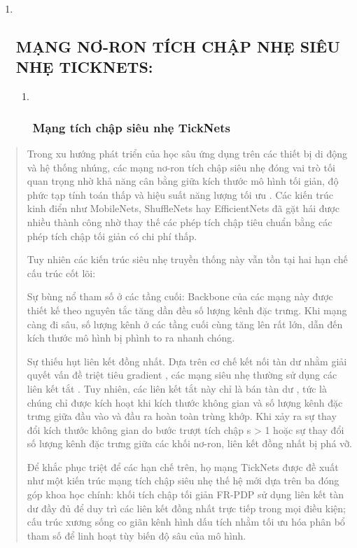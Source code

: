 \documentclass[
]{article}
\begin{document}
\begin{enumerate}
\def\labelenumi{\arabic{enumi}.}
\item ~
  \hypertarget{mux1ea1ng-nux1a1-ron-tuxedch-chux1eadp-nhux1eb9-siuxeau-nhux1eb9-ticknets}{%
  \subsection{MẠNG NƠ-RON TÍCH CHẬP NHẸ SIÊU NHẸ
  TICKNETS:}\label{mux1ea1ng-nux1a1-ron-tuxedch-chux1eadp-nhux1eb9-siuxeau-nhux1eb9-ticknets}}

  \begin{enumerate}
  \def\labelenumii{\arabic{enumii}.}
  \item ~
    \hypertarget{mux1ea1ng-tuxedch-chux1eadp-siuxeau-nhux1eb9-ticknets}{%
    \subsubsection{Mạng tích chập siêu nhẹ
    TickNets}\label{mux1ea1ng-tuxedch-chux1eadp-siuxeau-nhux1eb9-ticknets}}
  \end{enumerate}
\end{enumerate}

\begin{quote}
Trong xu hướng phát triển của học sâu ứng dụng trên các thiết bị di động
và hệ thống nhúng, các mạng nơ-ron tích chập siêu nhẹ đóng vai trò tối
quan trọng nhờ khả năng cân bằng giữa kích thước mô hình tối giản, độ
phức tạp tính toán thấp và hiệu suất năng lượng tối ưu . Các kiến trúc
kinh điển như MobileNets, ShuffleNets hay EfficientNets đã gặt hái được
nhiều thành công nhờ thay thế các phép tích chập tiêu chuẩn bằng các
phép tích chập tối giản có chi phí thấp.

Tuy nhiên các kiến trúc siêu nhẹ truyền thống này vẫn tồn tại hai hạn
chế cấu trúc cốt lõi:

Sự bùng nổ tham số ở các tầng cuối: Backbone của các mạng này được thiết
kế theo nguyên tắc tăng dần đều số lượng kênh đặc trưng. Khi mạng càng
đi sâu, số lượng kênh ở các tầng cuối cùng tăng lên rất lớn, dẫn đến
kích thước mô hình bị phình to ra nhanh chóng.

Sự thiếu hụt liên kết đồng nhất. Dựa trên cơ chế kết nối tàn dư nhằm
giải quyết vấn đề triệt tiêu gradient , các mạng siêu nhẹ thường sử dụng
các liên kết tắt . Tuy nhiên, các liên kết tắt này chỉ là bán tàn dư ,
tức là chúng chỉ được kích hoạt khi kích thước không gian và số lượng
kênh đặc trưng giữa đầu vào và đầu ra hoàn toàn trùng khớp. Khi xảy ra
sự thay đổi kích thước không gian do bước trượt tích chập s
\textgreater{} 1 hoặc sự thay đổi số lượng kênh đặc trưng giữa các khối
nơ-ron, liên kết đồng nhất bị phá vỡ.

Để khắc phục triệt để các hạn chế trên, họ mạng TickNets được đề xuất
như một kiến trúc mạng tích chập siêu nhẹ thế hệ mới dựa trên ba đóng
góp khoa học chính: khối tích chập tối giản FR-PDP sử dụng liên kết tàn
dư đầy đủ để duy trì các liên kết đồng nhất trực tiếp trong mọi điều
kiện; cấu trúc xương sống co giãn kênh hình dấu tích nhằm tối ưu hóa
phân bổ tham số để linh hoạt tùy biến độ sâu của mô hình.
\end{quote}
\end{document}
